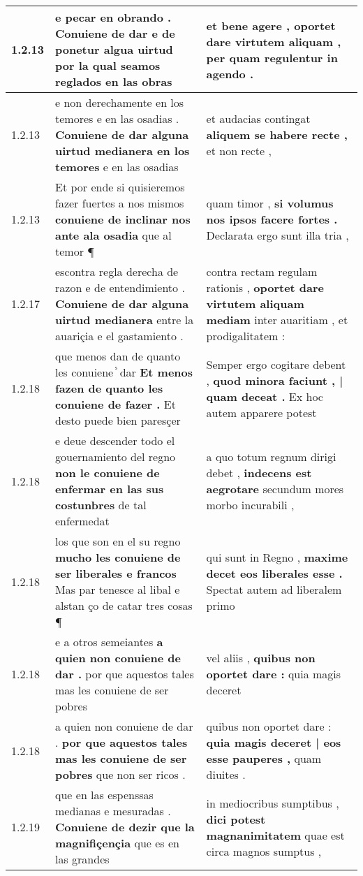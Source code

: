 \begin{tabular}{|p{1cm}|p{6.5cm}|p{6.5cm}|}
1.2.13 & e pecar en obrando . \textbf{ Conuiene de dar e de ponetur algua uirtud } por la qual seamos reglados en las obras & et bene agere , \textbf{ oportet dare virtutem aliquam , } per quam regulentur in agendo . \\\hline
1.2.13 & e non derechamente en los temores e en las osadias . \textbf{ Conuiene de dar alguna uirtud medianera en los temores } e en las osadias & et audacias contingat \textbf{ aliquem se habere recte , } et non recte , \\\hline
1.2.13 & Et por ende si quisieremos fazer fuertes a nos mismos \textbf{ conuiene de inclinar nos ante ala osadia } que al temor ¶ & quam timor , \textbf{ si volumus nos ipsos facere fortes . } Declarata ergo sunt illa tria , \\\hline
1.2.17 & escontra regla derecha de razon e de entendimiento . \textbf{ Conuiene de dar alguna uirtud medianera } entre la auariçia e el gastamiento . & contra rectam regulam rationis , \textbf{ oportet dare virtutem aliquam mediam } inter auaritiam , et prodigalitatem : \\\hline
1.2.18 & que menos dan de quanto les conuiene ᷤ dar \textbf{ Et menos fazen de quanto les conuiene de fazer . } Et desto puede bien paresçer & Semper ergo cogitare debent , \textbf{ quod minora faciunt , | quam deceat . } Ex hoc autem apparere potest \\\hline
1.2.18 & e deue descender todo el gouernamiento del regno \textbf{ non le conuiene de enfermar en las sus costunbres } de tal enfermedat & a quo totum regnum dirigi debet , \textbf{ indecens est aegrotare } secundum mores morbo incurabili , \\\hline
1.2.18 & los que son en el su regno \textbf{ mucho les conuiene de ser liberales e francos } Mas par tenesce al libal e alstan ço de catar tres cosas ¶ & qui sunt in Regno , \textbf{ maxime decet eos liberales esse . } Spectat autem ad liberalem primo \\\hline
1.2.18 & e a otros semeiantes \textbf{ a quien non conuiene de dar . } por que aquestos tales mas les conuiene de ser pobres & vel aliis , \textbf{ quibus non oportet dare : } quia magis deceret \\\hline
1.2.18 & a quien non conuiene de dar . \textbf{ por que aquestos tales mas les conuiene de ser pobres } que non ser ricos . & quibus non oportet dare : \textbf{ quia magis deceret | eos esse pauperes , } quam diuites . \\\hline
1.2.19 & que en las espenssas medianas e mesuradas . \textbf{ Conuiene de dezir que la magnifiçençia } que es en las grandes & in mediocribus sumptibus , \textbf{ dici potest magnanimitatem } quae est circa magnos sumptus , \\\hline

\end{tabular}
